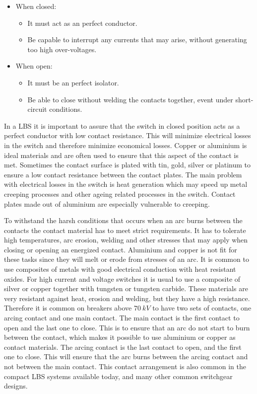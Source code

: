 \documentclass[10pt,a4paper]{article} %
\begin{document}
\begin{itemize}
\item When closed:
	\begin{itemize}
		\item It must act as an perfect conductor.
		\item Be capable to interrupt any currents that may arise, without generating too high over-voltages. 
	\end{itemize}
\item When open:
	\begin{itemize}
		\item It must be an perfect isolator.
		\item Be able to close without welding the contacts together, event under short-circuit conditions.
	\end{itemize}
\end{itemize}

In a LBS it is important to assure that the switch in closed position acts as a perfect conductor with low contact resistance. This will minimize electrical losses in the switch and therefore minimize economical losses. Copper or aluminium is ideal materials and are often used to ensure that this aspect of the contact is met. Sometimes the contact surface is plated with tin, gold, silver or platinum to ensure a low contact resistance between the contact plates. The main problem with electrical losses in the switch is heat generation which may speed up metal creeping processes and other ageing related processes in the switch. Contact plates made out of aluminium are especially vulnerable to creeping.
 
To withstand the harsh conditions that occurs when an arc burns between the contacts the contact material has to meet strict requirements. It has to tolerate high temperatures, arc erosion, welding and other stresses that may apply when closing or opening an energized contact. Aluminium and copper is not fit for these tasks since they will melt or erode from stresses of an arc. It is common to use composites of metals with good electrical conduction with heat resistant oxides. For high current and voltage switches it is usual to use a composite of silver or copper together with tungsten or tungsten carbide. These materials are very resistant against heat, erosion and welding, but they have a high resistance. Therefore it is common on breakers above $70 \ kV$ to have two sets of contacts, one arcing contact and one main contact. The main contact is the first contact to open and the last one to close. This is to ensure that an arc do not start to burn between the contact, which makes it possible to use aluminium or copper as contact materials. The arcing contact is the last contact to open, and the first one to close. This will ensure that the arc burns between the arcing contact and not between the main contact. This contact arrangement is also common in the compact LBS systems available today, and many other common switchgear designs.
\end{document}
